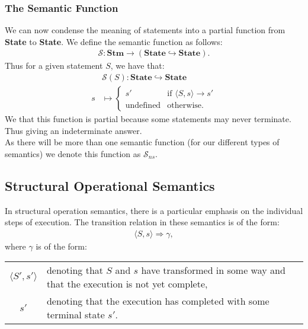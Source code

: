 \documentclass[a4paper, 12pt, twoside]{article}
\begin{document}
\newpage

\subsubsection{The Semantic Function}

We can now condense the meaning of statements into a partial
function from \textbf{State} to \textbf{State}. We define the semantic
function as follows: \begin{gather*}
  \mathcal{S}: \textbf{Stm} \to (\textbf{State} \hookrightarrow \textbf{State}).
\end{gather*} Thus for a given statement $S$, we have that: \begin{align*}
  &\mathcal{S}(S) : \textbf{State} \hookrightarrow \textbf{State} \\
  s &\mapsto \begin{cases}
    s' & \text{if } \langle S, s \rangle \to s' \\
    \text{undefined} & \text{otherwise}.
  \end{cases}
\end{align*} We that this function is partial because some statements
may never terminate. Thus giving an indeterminate answer.
\\[\baselineskip]
As there will be more than one semantic function (for our different types
of semantics) we denote this function as $\mathcal{S}_{ns}$.

\subsection{Structural Operational Semantics}

In structural operation semantics, there is a particular emphasis
on the individual steps of execution. The transition relation in
these semantics is of the form: \begin{gather*}
  \langle S, s \rangle \Rightarrow \gamma,
\end{gather*} where $\gamma$ is of the form:
\begin{center}
\renewcommand{\arraystretch}{1.5}
\begin{tabular}{ | c || p{8.5cm} | }
  \hline
  $\langle S', s' \rangle$ & denoting that $S$ and $s$
  have transformed in some way and that the execution is not
  yet complete, \\
  $s'$ & denoting that the execution has completed with some 
  terminal state $s'$. \\
  \hline
\end{tabular}
\end{center}
\end{document}
